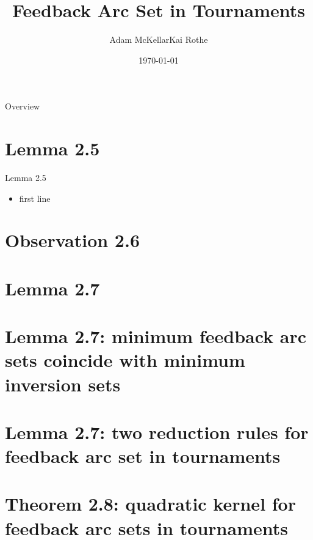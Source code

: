 \documentclass{beamer}
\author{Adam McKellar\qquad Kai Rothe\qquad}
\title{Feedback Arc Set in Tournaments}
\date{\today}
\begin{document}
	\frame{\titlepage}
	
	\begin{frame}{Overview}
		\tableofcontents
		\tiny
		\doclicenseThis
	\end{frame}

	\section{Lemma 2.5}
	\begin{frame}[fragile]{Lemma 2.5}
		\begin{itemize}[<+->]
			\item first line
		\end{itemize}
	\end{frame}

	\section{Observation 2.6}
	
	\section{Lemma 2.7}
	
	\section{Lemma 2.7: minimum feedback arc sets coincide with minimum inversion sets}
	
	\section{Lemma 2.7: two reduction rules for feedback arc set in tournaments}
	
	\section{Theorem 2.8: quadratic kernel for feedback arc sets in tournaments}
	
\end{document}

